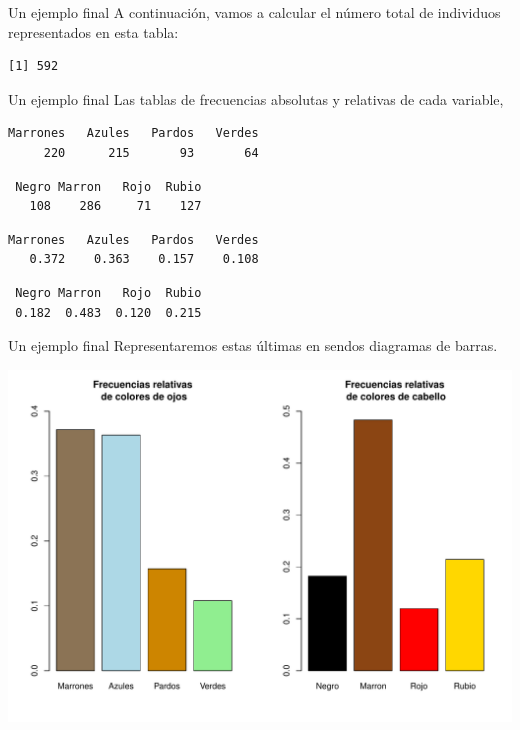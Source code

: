 \documentclass[
  ignorenonframetext,
]{beamer}
\begin{document}
\begin{frame}[fragile]{Un ejemplo final}
\label{un-ejemplo-final-3}
A continuación, vamos a calcular el número total de individuos
representados en esta tabla:

\begin{verbatim}
[1] 592
\end{verbatim}
\end{frame}

\begin{frame}[fragile]{Un ejemplo final}
\label{un-ejemplo-final-4}
Las tablas de frecuencias absolutas y relativas de cada variable,

\begin{verbatim}
Marrones   Azules   Pardos   Verdes 
     220      215       93       64 
\end{verbatim}

\begin{verbatim}
 Negro Marron   Rojo  Rubio 
   108    286     71    127 
\end{verbatim}

\begin{verbatim}
Marrones   Azules   Pardos   Verdes 
   0.372    0.363    0.157    0.108 
\end{verbatim}

\begin{verbatim}
 Negro Marron   Rojo  Rubio 
 0.182  0.483  0.120  0.215 
\end{verbatim}
\end{frame}

\begin{frame}{Un ejemplo final}
\label{un-ejemplo-final-5}
Representaremos estas últimas en sendos diagramas de barras.

\includegraphics{R_base_files/figure-beamer/unnamed-chunk-104-1.pdf}
\end{frame}
\end{document}

